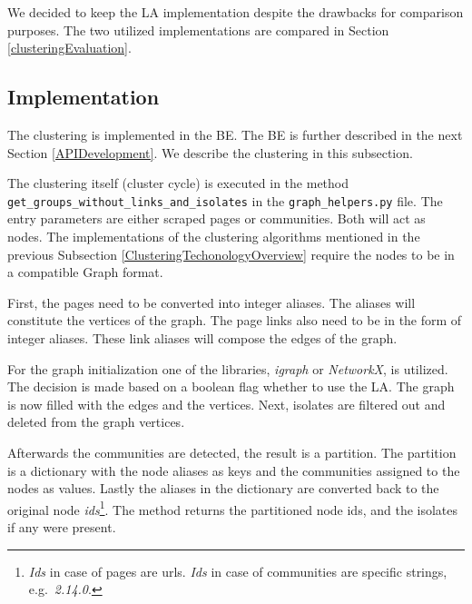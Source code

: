 We decided to keep the LA implementation despite the drawbacks for comparison purposes. The two utilized implementations are compared in Section \ref{clusteringEvaluation}.

\subsection{Implementation} \label{ClusteringImplementation}
The clustering is implemented in the BE. The BE is further described in the next Section \ref{APIDevelopment}. We describe the clustering in this subsection. 

The clustering itself (cluster cycle) is executed in the method \\ \texttt{get\_groups\_without\_links\_and\_isolates} in the \texttt{graph\_helpers.py} file. The entry parameters are either scraped pages or communities. Both will act as nodes. The implementations of the clustering algorithms mentioned in the previous Subsection \ref{ClusteringTechonologyOverview} require the nodes to be in a compatible Graph format. 

First, the pages need to be converted into integer aliases. The aliases will constitute the vertices of the graph. The page links also need to be in the form of integer aliases. These link aliases will compose the edges of the graph.

 For the graph initialization one of the libraries, \textit{igraph} or \textit{NetworkX}, is utilized. The decision is made based on a boolean flag whether to use the LA. The graph is now filled with the edges and the vertices. Next, isolates are filtered out and deleted from the graph vertices. 

Afterwards the communities are detected, the result is a partition. The partition is a dictionary with the node aliases as keys and the communities assigned to the nodes as values. Lastly the aliases in the dictionary are converted back to the original node \textit{ids}\footnote{\textit{Ids} in case of pages are urls. \textit{Ids} in case of communities are specific strings, e.g.~\textit{2.14.0}.}. The method returns the partitioned node ids, and the isolates if any were present. 

